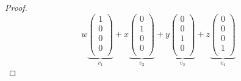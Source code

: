 \documentclass[12pt]{article}
\begin{document}
\begin{enumerate}
\begin{mybox}
\begin{proof}
$$    w \underbrace{
        \begin{pmatrix}
            1 \\ 0 \\ 0 \\ 0 \\
        \end{pmatrix}
    }_{v_1}
    + x
    \underbrace{
        \begin{pmatrix}
            0 \\ 1 \\ 0 \\ 0 \\
        \end{pmatrix}
    }_{v_2}
    + y
    \underbrace{
        \begin{pmatrix}
            0 \\ 0 \\ 1 \\ 0 \\
        \end{pmatrix}
    }_{v_3} 
    + z
    \underbrace{
        \begin{pmatrix}
            0 \\ 0 \\ 0 \\ 1 \\
        \end{pmatrix}
    }_{v_4} 
    $$
    

\end{proof}
\end{mybox}
\end{enumerate}
\end{document}
